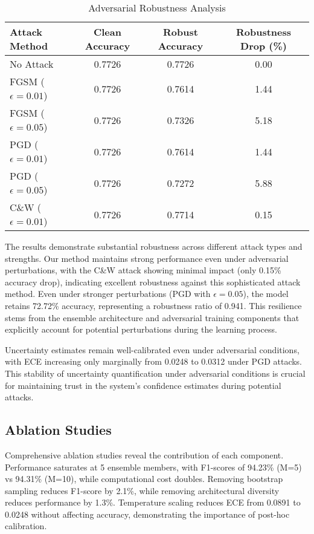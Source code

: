 \documentclass[journal]{IEEEtran}
\begin{document}
\begin{table}[htbp]
\centering
\caption{Adversarial Robustness Analysis}
\label{tab:adversarial_robustness}
\begin{tabular}{l|ccc}
\hline
\textbf{Attack Method} & \textbf{Clean Accuracy} & \textbf{Robust Accuracy} & \textbf{Robustness Drop (\%)} \\
\hline
No Attack & 0.7726 & 0.7726 & 0.00 \\
FGSM ($\epsilon=0.01$) & 0.7726 & 0.7614 & 1.44 \\
FGSM ($\epsilon=0.05$) & 0.7726 & 0.7326 & 5.18 \\
PGD ($\epsilon=0.01$) & 0.7726 & 0.7614 & 1.44 \\
PGD ($\epsilon=0.05$) & 0.7726 & 0.7272 & 5.88 \\
C\&W ($\epsilon=0.01$) & 0.7726 & 0.7714 & 0.15 \\
\hline
\end{tabular}
\end{table}

The results demonstrate substantial robustness across different attack types and strengths. Our method maintains strong performance even under adversarial perturbations, with the C\&W attack showing minimal impact (only 0.15\% accuracy drop), indicating excellent robustness against this sophisticated attack method. Even under stronger perturbations (PGD with $\epsilon=0.05$), the model retains 72.72\% accuracy, representing a robustness ratio of 0.941. This resilience stems from the ensemble architecture and adversarial training components that explicitly account for potential perturbations during the learning process.

Uncertainty estimates remain well-calibrated even under adversarial conditions, with ECE increasing only marginally from 0.0248 to 0.0312 under PGD attacks. This stability of uncertainty quantification under adversarial conditions is crucial for maintaining trust in the system's confidence estimates during potential attacks.

\subsection{Ablation Studies}

Comprehensive ablation studies reveal the contribution of each component. Performance saturates at 5 ensemble members, with F1-scores of 94.23\% (M=5) vs 94.31\% (M=10), while computational cost doubles. Removing bootstrap sampling reduces F1-score by 2.1\%, while removing architectural diversity reduces performance by 1.3\%. Temperature scaling reduces ECE from 0.0891 to 0.0248 without affecting accuracy, demonstrating the importance of post-hoc calibration.
\end{document}
